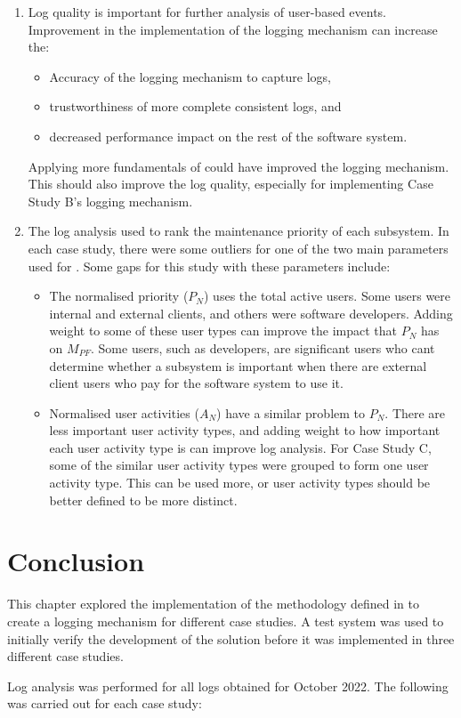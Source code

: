 \begin{enumerate}
	\item Log quality is important for further analysis of user-based events. Improvement in the implementation of the logging mechanism can increase the:
		\begin{itemize}
			\item Accuracy of the logging mechanism to capture logs,
			\item trustworthiness of more complete consistent logs, and
			\item decreased performance impact on the rest of the software system.
		\end{itemize}
	Applying more fundamentals of  could have improved the logging mechanism. This should also improve the log quality, especially for implementing Case Study B's logging mechanism.
	\item The log analysis used  to rank the maintenance priority of each subsystem. In each case study, there were some outliers for one of the two main parameters used for . Some gaps for this study with these parameters include:
		\begin{itemize}
			\item The normalised priority ($P_N$) uses the total active users. Some users were internal and external clients, and others were software developers. Adding weight to some of these user types can improve the impact that $P_N$ has on $M_{PF}$. Some users, such as developers, are significant users who cant determine whether a subsystem is important when there are external client users who pay for the software system to use it.
			\item Normalised user activities ($A_N$) have a similar problem to $P_N$. There are less important user activity types, and adding weight to how important each user activity type is can improve log analysis. For Case Study C, some of the similar user activity types were grouped to form one user activity type. This can be used more, or user activity types should be better defined to be more distinct.
		\end{itemize}
\end{enumerate}

\clearpage

\section{Conclusion}
This chapter explored the implementation of the methodology defined in  to create a logging mechanism for different case studies. A test system was used to initially verify the development of the solution before it was implemented in three different case studies. \par Log analysis was performed for all logs obtained for October 2022. The following was carried out for each case study:

